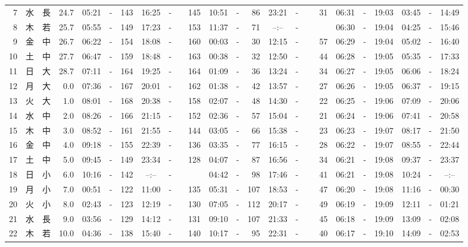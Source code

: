 \documentclass[12pt,a4j]{jsarticle}
\begin{document}
\begin{table}[htbp]
\begin{center}
{\begin{tabular}{|rc|cr|ccrccr|ccrccr|ccc|ccc|}
 7 & 水 & 長 & 24.7 &  05:21 &-& 143 &  16:25 &-& 145 &  10:51 &-&  86 &  23:21 &-&  31 & 06:31 & -& 19:03 & 03:45 & -& 14:49 \\
 8 & 木 & 若 & 25.7 &  05:55 &-& 149 &  17:23 &-& 153 &  11:37 &-&  71 &  --:-- &-&~~~~~ & 06:30 & -& 19:04 & 04:25 & -& 15:46 \\
 9 & 金 & 中 & 26.7 &  06:22 &-& 154 &  18:08 &-& 160 &  00:03 &-&  30 &  12:15 &-&  57 & 06:29 & -& 19:04 & 05:02 & -& 16:40 \\
10 & 土 & 中 & 27.7 &  06:47 &-& 159 &  18:48 &-& 163 &  00:38 &-&  32 &  12:50 &-&  44 & 06:28 & -& 19:05 & 05:35 & -& 17:33 \\
11 & 日 & 大 & 28.7 &  07:11 &-& 164 &  19:25 &-& 164 &  01:09 &-&  36 &  13:24 &-&  34 & 06:27 & -& 19:05 & 06:06 & -& 18:24 \\
12 & 月 & 大 &  0.0 &  07:36 &-& 167 &  20:01 &-& 162 &  01:38 &-&  42 &  13:57 &-&  27 & 06:26 & -& 19:05 & 06:37 & -& 19:15 \\
13 & 火 & 大 &  1.0 &  08:01 &-& 168 &  20:38 &-& 158 &  02:07 &-&  48 &  14:30 &-&  22 & 06:25 & -& 19:06 & 07:09 & -& 20:06 \\
14 & 水 & 中 &  2.0 &  08:26 &-& 166 &  21:15 &-& 152 &  02:36 &-&  57 &  15:04 &-&  21 & 06:24 & -& 19:06 & 07:41 & -& 20:58 \\
15 & 木 & 中 &  3.0 &  08:52 &-& 161 &  21:55 &-& 144 &  03:05 &-&  66 &  15:38 &-&  23 & 06:23 & -& 19:07 & 08:17 & -& 21:50 \\
16 & 金 & 中 &  4.0 &  09:18 &-& 155 &  22:39 &-& 136 &  03:35 &-&  77 &  16:15 &-&  28 & 06:22 & -& 19:07 & 08:55 & -& 22:44 \\
17 & 土 & 中 &  5.0 &  09:45 &-& 149 &  23:34 &-& 128 &  04:07 &-&  87 &  16:56 &-&  34 & 06:21 & -& 19:08 & 09:37 & -& 23:37 \\
18 & 日 & 小 &  6.0 &  10:16 &-& 142 &  --:-- &-&~~~~~ &  04:42 &-&  98 &  17:46 &-&  41 & 06:21 & -& 19:08 & 10:24 & -& --:-- \\
19 & 月 & 小 &  7.0 &  00:51 &-& 122 &  11:00 &-& 135 &  05:31 &-& 107 &  18:53 &-&  47 & 06:20 & -& 19:08 & 11:16 & -& 00:30 \\
20 & 火 & 小 &  8.0 &  02:43 &-& 123 &  12:19 &-& 130 &  07:05 &-& 112 &  20:17 &-&  49 & 06:19 & -& 19:09 & 12:11 & -& 01:21 \\
21 & 水 & 長 &  9.0 &  03:56 &-& 129 &  14:12 &-& 131 &  09:10 &-& 107 &  21:33 &-&  45 & 06:18 & -& 19:09 & 13:09 & -& 02:08 \\
22 & 木 & 若 & 10.0 &  04:36 &-& 138 &  15:40 &-& 140 &  10:17 &-&  95 &  22:31 &-&  40 & 06:17 & -& 19:10 & 14:09 & -& 02:53 \\

\end{tabular}}
\end{center}
\end{table}
\end{document}
